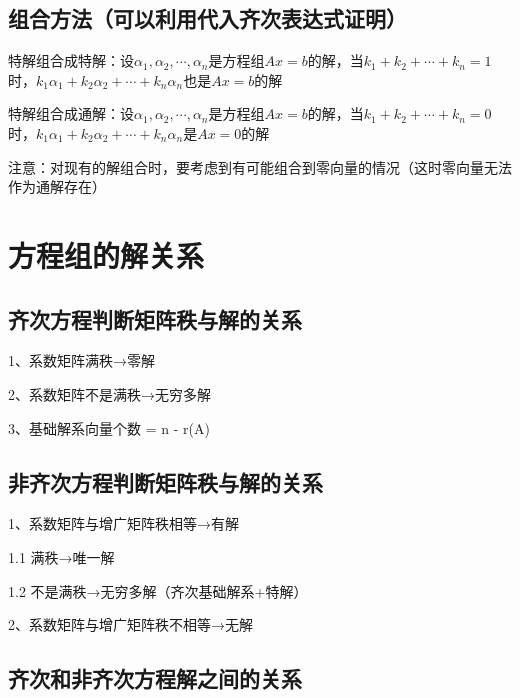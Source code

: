 \subsection{组合方法（可以利用代入齐次表达式证明）}

特解组合成特解：设$ \alpha_1,\alpha_2,\cdots,\alpha_n $是方程组$ Ax=b $的解，当$ k_1+k_2+\cdots+k_n=1 $时，$ k_1\alpha_1+k_2\alpha_2+\cdots+k_n\alpha_n  $也是$ Ax=b $的解

特解组合成通解：设$ \alpha_1,\alpha_2,\cdots,\alpha_n $是方程组$ Ax=b $的解，当$ k_1+k_2+\cdots+k_n=0 $时，$ k_1\alpha_1+k_2\alpha_2+\cdots+k_n\alpha_n  $是$ Ax=0 $的解

注意：对现有的解组合时，要考虑到有可能组合到零向量的情况（这时零向量无法作为通解存在）

\section{方程组的解关系}



\subsection{齐次方程判断矩阵秩与解的关系}

1、系数矩阵满秩→零解

2、系数矩阵不是满秩→无穷多解

3、基础解系向量个数 = n - r(A)



\subsection{非齐次方程判断矩阵秩与解的关系}

1、系数矩阵与增广矩阵秩相等→有解

1.1 满秩→唯一解

1.2 不是满秩→无穷多解（齐次基础解系+特解）

2、系数矩阵与增广矩阵秩不相等→无解



\subsection{齐次和非齐次方程解之间的关系}

